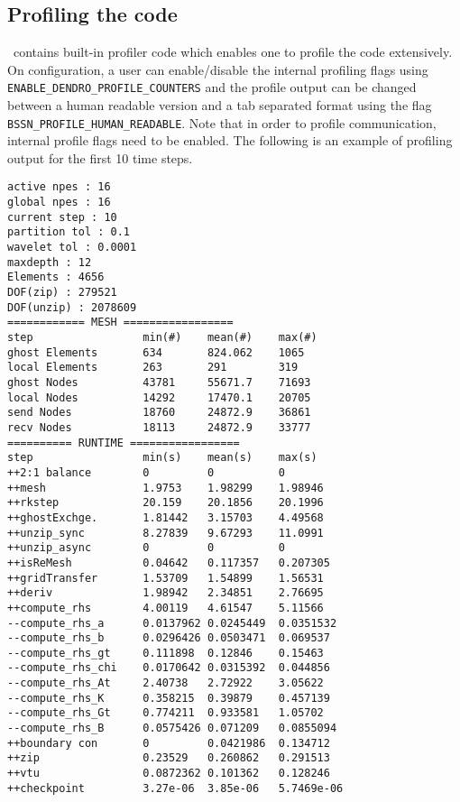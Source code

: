 \subsection{Profiling the code}
\dendro\ contains built-in profiler code which enables one to profile the 
code extensively. On configuration, a user can enable/disable 
the internal profiling flags using \texttt{ENABLE\_DENDRO\_PROFILE\_COUNTERS} 
and the profile output can be changed between a human readable version and a 
tab separated format using the flag \texttt{BSSN\_PROFILE\_HUMAN\_READABLE}.
Note that in order to profile communication, internal profile flags need to 
be enabled. The following is an example of profiling output for the first 
10 time steps. 
\begin{lstlisting}[basicstyle=\tiny]
active npes : 16
global npes : 16
current step : 10
partition tol : 0.1
wavelet tol : 0.0001
maxdepth : 12
Elements : 4656
DOF(zip) : 279521
DOF(unzip) : 2078609
============ MESH =================
step                 min(#)    mean(#)    max(#)                        
ghost Elements       634       824.062    1065                          
local Elements       263       291        319                           
ghost Nodes          43781     55671.7    71693                         
local Nodes          14292     17470.1    20705                         
send Nodes           18760     24872.9    36861                         
recv Nodes           18113     24872.9    33777                         
========== RUNTIME =================
step                 min(s)    mean(s)    max(s)                        
++2:1 balance        0         0          0                             
++mesh               1.9753    1.98299    1.98946                       
++rkstep             20.159    20.1856    20.1996                       
++ghostExchge.       1.81442   3.15703    4.49568                       
++unzip_sync         8.27839   9.67293    11.0991                       
++unzip_async        0         0          0                             
++isReMesh           0.04642   0.117357   0.207305                      
++gridTransfer       1.53709   1.54899    1.56531                       
++deriv              1.98942   2.34851    2.76695                       
++compute_rhs        4.00119   4.61547    5.11566                       
--compute_rhs_a      0.0137962 0.0245449  0.0351532                     
--compute_rhs_b      0.0296426 0.0503471  0.069537                      
--compute_rhs_gt     0.111898  0.12846    0.15463                       
--compute_rhs_chi    0.0170642 0.0315392  0.044856                      
--compute_rhs_At     2.40738   2.72922    3.05622                       
--compute_rhs_K      0.358215  0.39879    0.457139                      
--compute_rhs_Gt     0.774211  0.933581   1.05702                       
--compute_rhs_B      0.0575426 0.071209   0.0855094                     
++boundary con       0         0.0421986  0.134712                      
++zip                0.23529   0.260862   0.291513                      
++vtu                0.0872362 0.101362   0.128246                      
++checkpoint         3.27e-06  3.85e-06   5.7469e-06     
\end{lstlisting}


